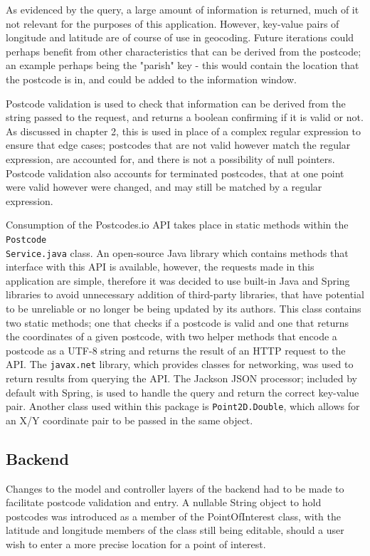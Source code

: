 As evidenced by the query, a large amount of information is returned, much of it not relevant for the purposes of this application. However, key-value pairs of longitude and latitude are of course of use in geocoding. Future iterations could perhaps benefit from other characteristics that can be derived from the postcode; an example perhaps being the "parish" key - this would contain the location that the postcode is in, and could be added to the information window.

Postcode validation is used to check that information can be derived from the string passed to the request, and returns a boolean confirming if it is valid or not. As discussed in chapter 2, this is used in place of a complex regular expression to ensure that edge cases; postcodes that are not valid however match the regular expression, are accounted for, and there is not a possibility of null pointers. Postcode validation also accounts for terminated postcodes, that at one point were valid however were changed, and may still be matched by a regular expression.

Consumption of the Postcodes.io API takes place in static methods within the \texttt{Postcode\\Service.java} class. An open-source Java library which contains methods that interface with this API is available, however, the requests made in this application are simple, therefore it was decided to use built-in Java and Spring libraries to avoid unnecessary addition of third-party libraries, that have potential to be unreliable or no longer be being updated by its authors. This class contains two static methods; one that checks if a postcode is valid and one that returns the coordinates of a given postcode, with two helper methods that encode a postcode as a UTF-8 string and returns the result of an HTTP request to the API. The \texttt{javax.net} library, which provides classes for networking, was used to return results from querying the API. The Jackson JSON processor; included by default with Spring, is used to handle the query and return the correct key-value pair. Another class used within this package is \texttt{Point2D.Double}, which allows for an X/Y coordinate pair to be passed in the same object.

\subsection{Backend}

Changes to the model and controller layers of the backend had to be made to facilitate postcode validation and entry. A nullable String object to hold postcodes was introduced as a member of the PointOfInterest class, with the latitude and longitude members of the class still being editable, should a user wish to enter a more precise location for a point of interest.

